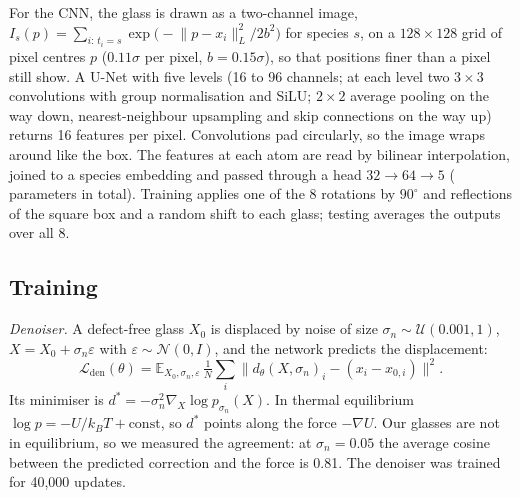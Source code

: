\documentclass[11pt]{article}
\makeatletter
\newcommand{\pd}[1]{\@ifundefined{pd@#1}{\textcolor{red}{[#1]}}{\csname pd@#1\endcsname}}
\makeatother
\begin{document}
For the CNN, the glass is drawn as a two-channel image, $I_s(p)=\sum_{i:\,t_i=s}\exp\big(-\lVert p-x_i\rVert_L^2/2b^2\big)$ for species $s$, on a $128\times128$ grid of pixel centres $p$ ($0.11\sigma$ per pixel, $b=0.15\sigma$), so that positions finer than a pixel still show. A U-Net with five levels (16 to 96 channels; at each level two $3\times3$ convolutions with group normalisation and SiLU; $2\times2$ average pooling on the way down, nearest-neighbour upsampling and skip connections on the way up) returns 16 features per pixel. Convolutions pad circularly, so the image wraps around like the box. The features at each atom are read by bilinear interpolation, joined to a species embedding and passed through a head $32\to64\to5$ (\pd{size-cnn} parameters in total). Training applies one of the 8 rotations by $90^\circ$ and reflections of the square box and a random shift to each glass; testing averages the outputs over all 8.

\subsection*{Training}
\emph{Denoiser.} A defect-free glass $X_0$ is displaced by noise of size $\sigma_n\sim\mathcal U(0.001,1)$, $X=X_0+\sigma_n\varepsilon$ with $\varepsilon\sim\mathcal N(0,I)$, and the network predicts the displacement:
\begin{equation}
\mathcal L_{\text{den}}(\theta)=\mathbb E_{X_0,\sigma_n,\varepsilon}\,\tfrac{1}{N}\textstyle\sum_i\big\lVert d_\theta(X,\sigma_n)_i-(x_i-x_{0,i})\big\rVert^2 .
\label{eq:den}
\end{equation}
Its minimiser is $d^*=-\sigma_n^2\nabla_X\log p_{\sigma_n}(X)$\citep{vincent2011,efron2011}. In thermal equilibrium $\log p=-U/k_BT+\text{const}$, so $d^*$ points along the force $-\nabla U$. Our glasses are not in equilibrium, so we measured the agreement: at $\sigma_n=0.05$ the average cosine between the predicted correction and the force is 0.81. The denoiser was trained for 40,000 updates.
\end{document}
